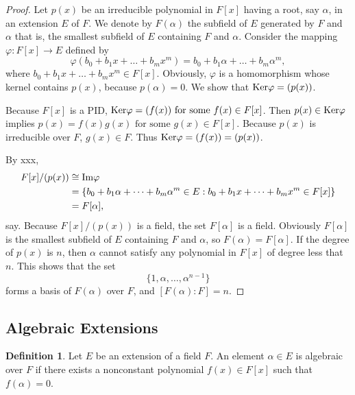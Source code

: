 \documentclass[draft]{article}
\theoremstyle{definition}
\newtheorem{defn}{Definition}[section]
\theoremstyle{remark}
\begin{document}
			\begin{proof}
			    Let $p(x)$ be an irreducible polynomial in $F[x]$ having a root, say $\alpha$, in an extension $E$ of $F$. We denote by $F(\alpha)$ the subfield of $E$ generated by $F$ and $\alpha$ that is, the smallest subfield of $E$ containing $F$ and $\alpha$. Consider the mapping $\varphi : F[x] \to E$ defined by
			    \begin{equation*}
			        \varphi(b_0 + b_1x + \dots + b_mx^m) = b_0 + b_1\alpha + \dots + b_m\alpha^m,
			    \end{equation*}
			    where $b_0 + b_1x + \dots + b_mx^m \in F[x]$. Obviously, $\varphi$ is a homomorphism whose kernel contains $p(x)$, because $p(\alpha) = 0$. We show that $\textup{Ker}\varphi = (p(x))$.\par
			    Because $F[x]$ is a PID, $\textup{Ker}\varphi = (f(x)) \text{ for some } f(x) \in F[x]$. Then $p(x) \in \textup{Ker}\varphi$ implies $p(x) = f(x)g(x) \text{ for some } g(x) \in F[x]$. Because $p(x)$ is irreducible over $F$, $g(x) \in F$. Thus $\textup{Ker}\varphi = (f(x)) = (p(x))$.\par
			    By xxx,
			    \begin{align*}
			        F[x]/(p(x)) &\cong \textup{Im}\varphi\\
			        &= \{b_0 + b_1\alpha + \dots + b_m\alpha^m \in E : b_0 + b_1x + \dots + b_mx^m \in F[x]\}\\
			        &= F[\alpha],
			    \end{align*}
			    say. Because $F[x]/(p(x))$ is a field, the set $F[\alpha]$ is a field. Obviously $F[\alpha]$ is the smallest subfield of $E$ containing $F$ and $\alpha$, so $F(\alpha) = F[\alpha]$. If the degree of $p(x)$ is $n$, then $\alpha$ cannot satisfy any polynomial in $F[x]$ of degree less that $n$. This shows that the set
			    \begin{equation*}
			        \{1, \alpha, \dots, \alpha^{n - 1}\}
			    \end{equation*}
			    forms a basis of $F(\alpha)$ over $F$, and $[F(\alpha) : F] = n$.
			\end{proof}
			
		\subsection{Algebraic Extensions}
		
		    \begin{defn}
                Let $E$ be an extension of a field $F$. An element $\alpha \in E$ is algebraic over $F$ if there exists a nonconstant polynomial $f(x) \in F[x]$ such that $f(\alpha) = 0$.
            \end{defn}
            
\end{document}
